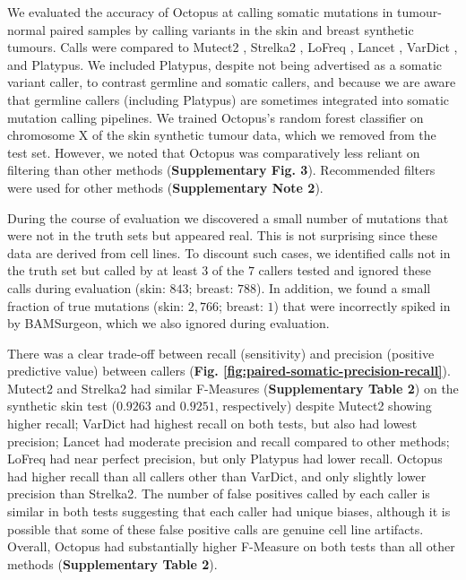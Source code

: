 \documentclass[notitlepage, twocolumn, 10pt]{article}
\begin{document}
We evaluated the accuracy of Octopus at calling somatic mutations in tumour-normal paired samples by calling variants in the skin and breast synthetic tumours. Calls were compared to Mutect2 \cite{RN142}, Strelka2 \cite{RN604}, LoFreq \cite{RN601}, Lancet \cite{RN600}, VarDict \cite{RN544}, and Platypus. We included Platypus, despite not being advertised as a somatic variant caller, to contrast germline and somatic callers, and because we are aware that germline callers (including Platypus) are sometimes integrated into somatic mutation calling pipelines. We trained Octopus's random forest classifier on chromosome X of the skin synthetic tumour data, which we removed from the test set. However, we noted that Octopus was comparatively less reliant on filtering than other methods (\textbf{Supplementary Fig. 3}). Recommended filters were used for other methods (\textbf{Supplementary Note 2}).

During the course of evaluation we discovered a small number of mutations that were not in the truth sets but appeared real. This is not surprising since these data are derived from cell lines. To discount such cases, we identified calls not in the truth set but called by at least $3$ of the $7$ callers tested and ignored these calls during evaluation (skin: $843$; breast: $788$). In addition, we found a small fraction of true mutations (skin: $2,766$; breast: $1$) that were incorrectly spiked in by BAMSurgeon, which we also ignored during evaluation.

There was a clear trade-off between recall (sensitivity) and precision (positive predictive value) between callers (\textbf{Fig. \ref{fig:paired-somatic-precision-recall}}). Mutect2 and Strelka2 had similar F-Measures (\textbf{Supplementary Table 2}) on the synthetic skin test ($0.9263$ and $0.9251$, respectively) despite Mutect2 showing higher recall; VarDict had highest recall on both tests, but also had lowest precision; Lancet had moderate precision and recall compared to other methods; LoFreq had near perfect precision, but only Platypus had lower recall. Octopus had higher recall than all callers other than VarDict, and only slightly lower precision than Strelka2. The number of false positives called by each caller is similar in both tests suggesting that each caller had unique biases, although it is possible that some of these false positive calls are genuine cell line artifacts. Overall, Octopus had substantially higher F-Measure on both tests than all other methods (\textbf{Supplementary Table 2}).
\end{document}
